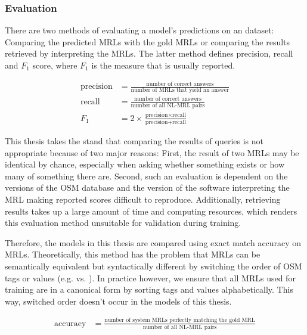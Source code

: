 \subsubsection{\nlmaps{} Evaluation}

There are two methods of evaluating a model’s predictions on an \nlmaps{}
dataset: Comparing the predicted MRLs with the gold MRLs or comparing the
results retrieved by interpreting the MRLs. The latter method defines precision,
recall and \(F_1\) score, where \(F_1\) is the measure that is usually reported.

\begin{align*}
  \text{precision} &= \frac{\text{number of correct answers}}{\text{number of MRLs that yield an answer}}\\
  \text{recall} &= \frac{\text{number of correct answers}}{\text{number of all NL-MRL pairs}}\\
  F_1 &= 2 \times \frac{\text{precision} \times \text{recall}}{\text{precision} + \text{recall}}
\end{align*}

This thesis takes the stand that comparing the results of queries is not
appropriate because of two major reasons: First, the result of two MRLs may be
identical by chance, especially when asking whether something exists or how many
of something there are. Second, such an evaluation is dependent on the versions
of the OSM database and the version of the software interpreting the MRL making
reported scores difficult to reproduce. Additionally, retrieving results takes
up a large amount of time and computing resources, which renders this evaluation
method unsuitable for validation during training.

Therefore, the models in this thesis are compared using exact match accuracy on
MRLs. Theoretically, this method has the problem that MRLs can be semantically
equivalent but syntactically different by switching the order of OSM tags or
values (e.g.  vs.
). In practice however, we ensure
that all MRLs used for training are in a canonical form by sorting tags and
values alphabetically. This way, switched order doesn’t occur in the models of
this thesis.

\begin{align*}
  \text{accuracy} &= \frac{\text{number of system MRLs perfectly matching the gold MRL}}{\text{number of all NL-MRL pairs}}
\end{align*}

